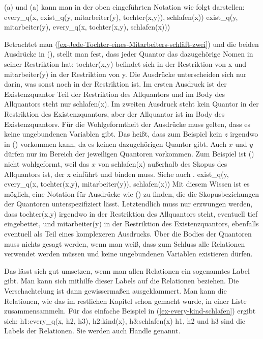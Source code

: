 \noindent
(a) und (a) kann man in der oben eingeführten Notation wie folgt darstellen:
\eal
\label{ex-Quantoren-Mitarbeiter-Tochter}
\ex every\_q(x, exist\_q(y, mitarbeiter(y), tochter(x,y)), schlafen(x))
\ex exist\_q(y, mitarbeiter(y), every\_q(x, tochter(x,y), schlafen(x)))
\zl 

\noindent
Betrachtet man (\ref{ex-Jede-Tochter-eines-Mitarbeiters-schläft-zwei}) und die beiden Ausdrücke in
(), stellt man fest, dass jeder Quantor das dazugehörige Nomen in seiner Restriktion hat:
tochter(x,y) befindet sich in der Restriktion von x und mitarbeiter(y) in der Restriktion von y. Die
Ausdrücke unterscheiden sich nur darin, was sonst noch in der Restriktion ist. Im ersten Ausdruck
ist der Existenzquantor Teil der Restriktion des Allquantors und im Body des Allquantors steht nur
schlafen(x). Im zweiten Ausdruck steht kein Quantor in der Restriktion des Existenzquantors, aber
der Allquantor ist im Body des Existenzquantors. Für die Wohlgeformtheit der Ausdrücke muss gelten,
dass es keine ungebundenen Variablen gibt. Das heißt, dass zum Beispiel kein $z$ irgendwo in
() vorkommen kann, da es keinen dazugehörigen Quantor gibt. Auch $x$ und $y$ dürfen nur im
Bereich der jeweiligen Quantoren vorkommen. Zum Beispiel ist () nicht wohlgeformt, weil das
$x$ von schlafen(x) außerhalb des Skopus des Allquantors ist, der x einführt und binden muss. Siehe
auch .
\ea
exist\_q(y, every\_q(x, tochter(x,y), mitarbeiter(y)),  schlafen(x))
\z
Mit diesem Wissen ist es möglich, eine Notation für
Ausdrücke wie () zu finden, die die Skopusbeziehungen der Quantoren unterspezifiziert
lässt. Letztendlich muss nur erzwungen werden, dass tochter(x,y) irgendwo in der Restriktion des
Allquantors steht, eventuell tief eingebettet, und mitarbeiter(y) in der Restriktion des
Existenzquantors, ebenfalls eventuell als Teil eines komplexeren Ausdrucks. Über die Bodies der
Quantoren muss nichts gesagt werden, wenn man weiß, dass zum Schluss alle Relationen verwendet
werden müssen und keine ungebundenen Variablen existieren dürfen. 

Das lässt sich gut umsetzen, wenn man allen Relationen ein sogenanntes Label gibt. Man kann sich
mithilfe dieser Labels auf die Relationen beziehen. Die Verschachtelung ist dann gewissermaßen
ausgeklammert. Man kann die Relationen, wie das im restlichen Kapitel schon gemacht wurde, in einer
Liste zusammensammeln. Für das einfache Beispiel in (\ref{ex-every-kind-schlafen}) ergibt sich:
\ea
\label{ex-every-kind-schlafen-handles}
h1:every\_q(x, h2, h3), h2:kind(x), h3:schlafen(x)
\z
h1, h2 und h3 sind die Labels der Relationen. Sie werden auch Handle genannt.
\largerpage[2]

